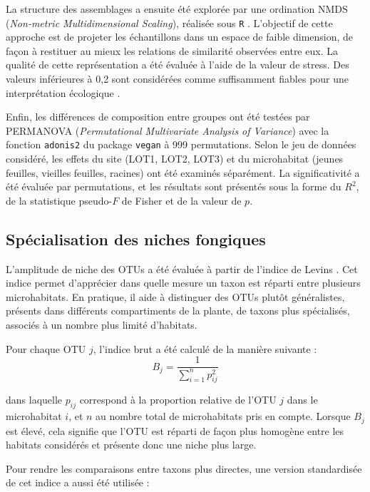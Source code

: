 \documentclass[alpha-refs,twocolumn]{wiley-article}
\begin{document}
La structure des assemblages a ensuite été explorée par une ordination NMDS (\textit{Non-metric Multidimensional Scaling}), réalisée sous \texttt{R} \citep{kruskal1964nonmetric,minchin1987evaluation}. L’objectif de cette approche est de projeter les échantillons dans un espace de faible dimension, de façon à restituer au mieux les relations de similarité observées entre eux. La qualité de cette représentation a été évaluée à l’aide de la valeur de stress. Des valeurs inférieures à 0{,}2 sont considérées comme suffisamment fiables pour une interprétation écologique \citep{kruskal1964nonmetric}.

Enfin, les différences de composition entre groupes ont été testées par PERMANOVA (\textit{Permutational Multivariate Analysis of Variance}) avec la fonction \texttt{adonis2} du package \texttt{vegan} \citep{anderson2001new} à 999 permutations. Selon le jeu de données considéré, les effets du site (LOT1, LOT2, LOT3) et du microhabitat (jeunes feuilles, vieilles feuilles, racines) ont été examinés séparément. La significativité a été évaluée par permutations, et les résultats sont présentés sous la forme du \(R^2\), de la statistique pseudo-\(F\) de Fisher et de la valeur de \(p\).

\subsection{Spécialisation des niches fongiques}

L’amplitude de niche des OTUs a été évaluée à partir de l’indice de Levins \citep{levins1968evolution}. Cet indice permet d’apprécier dans quelle mesure un taxon est réparti entre plusieurs microhabitats. En pratique, il aide à distinguer des OTUs plutôt généralistes, présents dans différents compartiments de la plante, de taxons plus spécialisés, associés à un nombre plus limité d’habitats.

Pour chaque OTU \(j\), l’indice brut a été calculé de la manière suivante :
\[ B_j = \frac{1}{\sum_{i=1}^{n} p_{ij}^{2}} \]

dans laquelle \(p_{ij}\) correspond à la proportion relative de l’OTU \(j\) dans le microhabitat \(i\), et \(n\) au nombre total de microhabitats pris en compte. Lorsque \(B_j\) est élevé, cela signifie que l’OTU est réparti de façon plus homogène entre les habitats considérés et présente donc une niche plus large.

Pour rendre les comparaisons entre taxons plus directes, une version standardisée de cet indice a aussi été utilisée :
\end{document}
